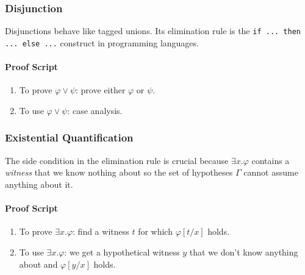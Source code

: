 \documentclass{amsart}
\begin{document}
\subsubsection{Disjunction}
\label{sec:disjunction}

Disjunctions behave like tagged unions.
Its elimination rule is the \texttt{if ... then ... else ...} construct in programming languages.

\paragraph{Proof Script}
\begin{enumerate}
\item To prove $\varphi \vee \psi$: prove either $\varphi$ or $\psi$.
\item To use $\varphi \vee \psi$: case analysis.
\end{enumerate}

\subsubsection{Existential Quantification}
\label{sec:existential-quantification}

The side condition in the elimination rule is crucial because $\exists x.\varphi$ contains a \emph{witness} that we know nothing about so the set of hypotheses $\Gamma$ cannot assume anything about it.

\paragraph{Proof Script}
\begin{enumerate}
\item To prove $\exists x.\varphi$: find a witness $t$ for which $\varphi[t/x]$ holds.
\item To use $\exists x.\varphi$: we get a hypothetical witness $y$ that we don't know anything about and $\varphi[y/x]$ holds.
\end{enumerate}
\end{document}

